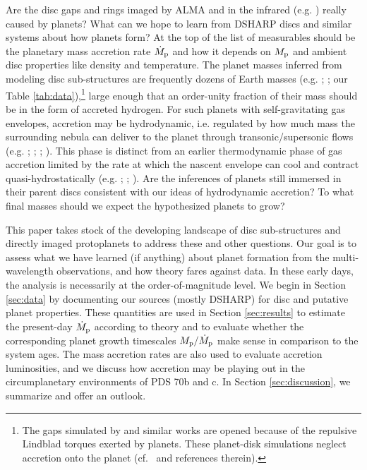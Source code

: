 \documentclass[fleqn,usenatbib]{mnras}
\begin{document}
Are the disc gaps and rings imaged by ALMA
and in the infrared (e.g. \citealt{asensio-torres_etal_2021}) really caused by planets? What can we hope to learn from DSHARP discs and similar systems about how planets form? At the top of the list of measurables should be the planetary mass accretion rate $\dot{M}_{\rm p}$ and how it depends on $M_{\rm p}$ and ambient disc properties like density and temperature. The planet masses inferred from modeling disc sub-structures are frequently dozens of Earth masses (e.g. \citealt{dong_fung_2017}; \citealt{zhang_etal_2018}; our Table \ref{tab:data}),\footnote{The gaps simulated by \citet{zhang_etal_2018} and similar works are opened  because of the repulsive Lindblad torques exerted by planets. These planet-disk simulations neglect accretion onto the planet (cf.~\citealt{rosenthal_etal_2020} and references therein).} large enough that an order-unity fraction of their mass should be in the form of accreted hydrogen. For 
such planets with self-gravitating gas envelopes, accretion may be hydrodynamic, i.e. 
regulated by how much mass the surrounding nebula can deliver to the planet through transonic/supersonic flows
(e.g. \citealt{dangelo_etal_2003}; \citealt{machida_etal_2010};  \citealt{tanigawa_tanaka_2016};  \citealt{ginzburg_chiang_2019a}). 
This phase is distinct from an earlier  thermodynamic phase of gas accretion limited by the rate at which the nascent envelope can cool and contract quasi-hydrostatically (e.g. \citealt{elee_chiang_2015}; \citealt{ginzburg_etal_2016}; \citealt{chachan_etal_2021}).
Are the inferences of planets still immersed in their parent discs consistent with our ideas of hydrodynamic accretion? To what final masses should we expect the hypothesized planets to grow?

This paper takes stock of the developing landscape of disc sub-structures and directly imaged protoplanets to address these and other questions. Our goal is to assess what we have learned (if anything) about planet formation from the multi-wavelength observations, and how theory fares against data. In these early days, the analysis is necessarily at the order-of-magnitude level. We begin in Section \ref{sec:data} by documenting our sources (mostly DSHARP) for disc and putative planet properties. These quantities are used in Section \ref{sec:results} to estimate the present-day $\dot{M}_{\rm p}$ according to theory and to evaluate whether the corresponding planet growth timescales $M_{\rm p}/\dot{M}_{\rm p}$ make sense in comparison to the system ages. The mass accretion rates are also used to evaluate accretion luminosities, and we discuss how accretion may be playing out in the circumplanetary environments of PDS 70b and c.
In Section \ref{sec:discussion}, we summarize and offer an outlook.
\end{document}
